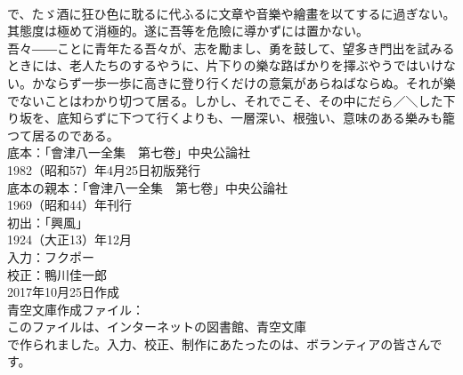 \documentclass[8pt]{extreport}
\begin{document}
\begin{CJK}{UTF8}{min}
\\	で、たゞ酒に狂ひ色に耽るに代ふるに文章や音樂や繪畫を以てするに過ぎない。其態度は極めて消極的。遂に吾等を危險に導かずには置かない。
\\	吾々――ことに青年たる吾々が、志を勵まし、勇を鼓して、望多き門出を試みるときには、老人たちのするやうに、片下りの樂な路ばかりを擇ぶやうではいけない。かならず一歩一歩に高きに登り行くだけの意氣があらねばならぬ。それが樂でないことはわかり切つて居る。しかし、それでこそ、その中にだら／＼した下り坂を、底知らずに下つて行くよりも、一層深い、根強い、意味のある樂みも籠つて居るのである。
\\	底本：「會津八一全集　第七卷」中央公論社
\\	1982（昭和57）年4月25日初版発行
\\	底本の親本：「會津八一全集　第七卷」中央公論社
\\	1969（昭和44）年刊行
\\	初出：「興風」
\\	1924（大正13）年12月
\\	入力：フクポー
\\	校正：鴨川佳一郎
\\	2017年10月25日作成
\\	青空文庫作成ファイル：
\\	このファイルは、インターネットの図書館、青空文庫
\\	で作られました。入力、校正、制作にあたったのは、ボランティアの皆さんです。
\end{CJK}
\end{document}
